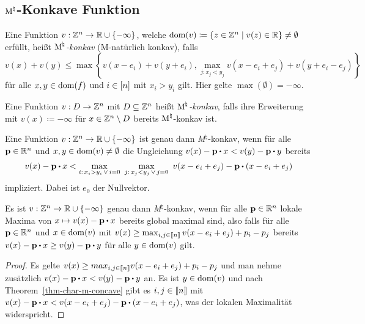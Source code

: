 \subsection{$\textrm{\textup{M}}^\natural$-Konkave Funktion}


\begin{definition}
	Eine Funktion $v:\mathbb{Z}^n \rightarrow \mathbb{R} \cup \{-\infty\}$, welche $\operatorname{dom}(v) \coloneqq \{ z\in\mathbb{Z}^n \mid v(z) \in \mathbb{R} \}\neq \emptyset$ erfüllt, heißt \emph{$\textrm{\textup{M}}^\natural$-konkav} (\glqq M-natürlich konkav\grqq), falls \[
	v(x) + v(y) \leq
	\max \left\{
		v(x - e_i) + v(y + e_i),
		\max_{j: x_j < y_j} v(x - e_i + e_j) + v(y + e_i - e_j)
	\right\}
	\] für alle $x,y\in\operatorname{dom}(f)$ und $i\in\left[ n \right]$ mit $x_i > y_i$ gilt.
	Hier gelte $\max(\emptyset)=-\infty$.
	
	Eine Funktion $v:D \rightarrow \mathbb{Z}^n$ mit $D\subseteq \mathbb{Z}^n$ heißt \emph{$\textrm{\textup{M}}^\natural$-konkav}, falls ihre Erweiterung mit $v(x)\coloneqq-\infty$ für $x\in\mathbb{Z}^n\setminus D$ bereits $\textrm{\textup{M}}^\natural$-konkav ist.
\end{definition}


\begin{theorem}[\cite{}]\label{thm-char-m-concave}
	Eine Funktion $v:\mathbb{Z}^n \rightarrow \mathbb{R} \cup \{ -\infty \}$ ist genau dann \emph{M}$^\natural$-konkav, wenn für alle $\mathbf{p}\in\mathbb{R}^n$ und $x,y\in\operatorname{dom}(v)\neq\emptyset$ die Ungleichung $v(x) - \fp\bcdot x < v(y) - \fp \bcdot y$ bereits \[ 
		v(x) - \fp\bcdot x < 
			\max_{i:\, x_i > y_i \,  \vee \, i = 0} \,\,
				\max_{j:\, x_j < y_j \, \vee \, j=0} \,\,
					v(x - e_i + e_j) - \fp \bcdot (x - e_i + e_j)
	\]
	impliziert. Dabei ist $e_0$ der Nullvektor.
\end{theorem}
\begin{korollar}\label{cor-concave-local-global}
	Es ist $v: \mathbb{Z}^n \rightarrow \mathbb{R} \cup \{ -\infty \}$ genau dann \emph{M}$^\natural$-konkav, wenn für alle $\mathbf{p}\in\mathbb{R}^n$ lokale Maxima von $x \mapsto v(x) - \fp \bcdot x$ bereits global maximal sind, also 
	falls für alle $\mathbf{p}\in\mathbb{R}^n$ und $x\in\operatorname{dom}(v)$ mit $
	v(x)\geq \max_{i,j\in\left\llbracket n \right\rrbracket} v(x - e_i + e_j) + p_i - p_j
	$
	bereits $v(x) - \fp \bcdot x \geq v(y) - \fp \bcdot y$ für alle $y\in\operatorname{dom}(v)$ gilt.
\end{korollar}
\begin{proof}
	Es gelte $v(x) \geq max_{i,j\in\left\llbracket n \right\rrbracket} v(x - e_i + e_j) + p_i - p_j$ und man nehme zusätzlich $v(x) - \fp\bcdot x < v(y) - \fp \bcdot y$ an.
	Es ist $y\in\operatorname{dom}(v)$ und nach Theorem~\ref{thm-char-m-concave} gibt es $i,j\in\left\llbracket n \right\rrbracket$ mit $v(x) - \fp \bcdot x < v(x - e_i + e_j) - \fp\bcdot (x - e_i + e_j)$, was der lokalen Maximalität widerspricht.
\end{proof}

